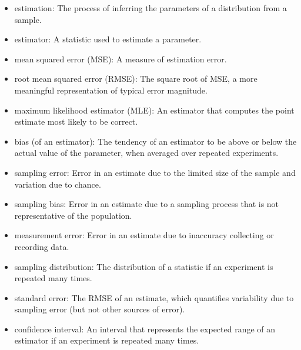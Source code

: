 \documentclass[12pt]{book}
\begin{document}
\begin{itemize}

\item estimation: The process of inferring the parameters of a distribution
from a sample.

\item estimator: A statistic used to estimate a parameter.

\item mean squared error (MSE): A measure of estimation error.

\item root mean squared error (RMSE): The square root of MSE,
a more meaningful representation of typical error magnitude.

\item maximum likelihood estimator (MLE): An estimator that computes the
point estimate most likely to be correct.

\item bias (of an estimator): The tendency of an estimator to be above or
  below the actual value of the parameter, when averaged over repeated
  experiments.  

\item sampling error: Error in an estimate due to the limited
  size of the sample and variation due to chance. 

\item sampling bias: Error in an estimate due to a sampling process
  that is not representative of the population. 

\item measurement error: Error in an estimate due to inaccuracy collecting
  or recording data. 

\item sampling distribution: The distribution of a statistic if an
  experiment is repeated many times.  

\item standard error: The RMSE of an estimate,
which quantifies variability due to sampling error (but not
other sources of error).

\item confidence interval: An interval that represents the expected
  range of an estimator if an experiment is repeated many times.
   

\end{itemize}
\end{document}
